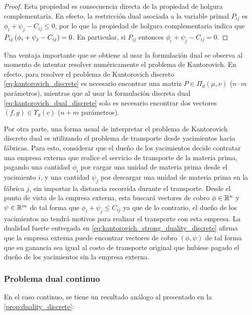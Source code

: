\begin{proof}
	Esta propiedad es consecuencia directa de la propiedad de holgura complementaria. En efecto, la restricción dual asociada a la variable primal $P_{ij}$ es $\phi_i + \psi_j - C_{ij}\leq 0$, por lo que la propiedad de holgura complementaria indica que $P_{ij}\left(\phi_i + \psi_j - C_{ij}\right) = 0$. En particular, si $P_{ij}$ entonces $\phi_i + \psi_j - C_{ij} = 0$.
\end{proof}

Una ventaja importante que se obtiene al usar la formulación dual se observa al momento de intentar resolver numéricamente el problema de Kantorovich. En efecto, para resolver el problema de Kantorovich discreto \eqref{eq:kantorovich_discrete} es necesario encontrar una matriz $P\in\Pi_d(\mu,\nu)$ ($n\cdot m$ parámetros), mientras que al usar la formulación discreta dual \eqref{eq:kantorovich_dual_discrete} solo es necesario encontrar dos vectores $(f,g)\in\Upsilon_d(c)$ ($n+m$ parámetros).

Por otra parte, una forma usual de interpretar el problema de Kantorovich discreto dual es utilizando el problema de transporte desde yacimientos hacia fábricas. Para esto, considerar que el dueño de los yacimientos decide contratar una empresa externa que realice el servicio de transporte de la materia prima, pagando una cantidad $\phi_i$ por cargar una unidad de materia prima desde el yacimiento $i$, y una cantidad $\psi_j$ por descargar una unidad de materia prima en la fábrica $j$, sin importar la distancia recorrida durante el transporte. Desde el punto de vista de la empresa externa, esta buscará vectores de cobro $\phi\in\mathbb{R}^n$ y $\psi\in\mathbb{R}^m$ de tal forma que $\phi_i+\psi_j\leq C_{ij}$ ya que de lo contrario, el dueño de los yacimientos no tendrá motivos para realizar el transporte con esta empresa. La dualidad fuerte entregada en \eqref{eq:kantorovich_strong_duality_discrete} afirma que la empresa externa puede encontrar vectores de cobro $(\phi,\psi)$ de tal forma que su ganancia sea igual al costo de transporte original que hubiese pagado el dueño de los yacimientos sin la empresa externa.

\subsubsection{Problema dual continuo}

En el caso continuo, se tiene un resultado análogo al presentado en la \autoref{prop:duality_discrete}:

